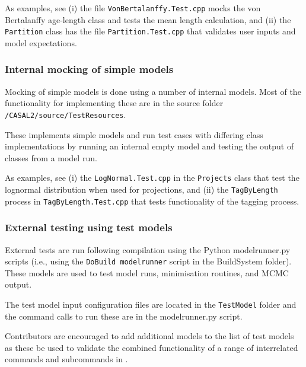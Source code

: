 As examples, see (i) the file \texttt{VonBertalanffy.Test.cpp} mocks the von Bertalanffy age-length class and tests the mean length calculation, and (ii) the \texttt{Partition} class has the file \texttt{Partition.Test.cpp} that validates user inputs and model expectations.

\subsubsection{Internal mocking of simple models}

Mocking of simple models is done using a number of internal models. Most of the functionality for implementing these are in the source folder \texttt{/CASAL2/source/TestResources}. 

These implements simple models and run test cases with differing class implementations by running an internal empty model and testing the output of classes from a model run. 

As examples, see (i) the \texttt{LogNormal.Test.cpp} in the \texttt{Projects} class that test the lognormal distribution when used for projections, and (ii) the \texttt{TagByLength} process in \texttt{TagByLength.Test.cpp} that tests functionality of the tagging process.

\subsubsection{External testing using test models}

External tests are run following compilation using the Python modelrunner.py scripts (i.e., using the \texttt{DoBuild modelrunner} script in the BuildSystem folder). These models are used to test model runs, minimisation routines, and MCMC output.

The test model input configuration files are located in the \texttt{TestModel} folder and the command calls to run these are in the modelrunner.py script.  

Contributors are encouraged to add additional models to the list of test models as these be used to validate the combined functionality of a range of interrelated commands and subcommands in \CNAME. 

